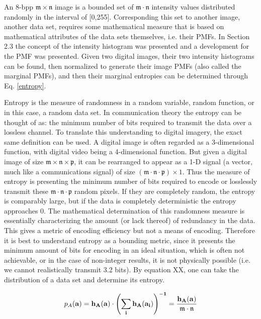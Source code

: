 An 8-bpp $\mathfrak{m} \times \mathfrak{n}$ image is a bounded  set of $\mathfrak{m} \cdot \mathfrak{n}$ intensity values distributed randomly in the interval of [0,255]. Corresponding this set to another image, \ie another data set, requires some mathematical measure that is based on mathematical attributes of the data sets themselves, i.e. their PMFs. In Section 2.3 the concept of the intensity histogram was presented and a development for the PMF was presented. Given two digital images, their two intensity histograms can be found, then normalized to generate their image PMFs (also called the marginal PMFs), and then their marginal entropies can be determined through Eq. \ref{entropy}.

Entropy is the measure of randomness in a random variable, random function, or in this case, a random data set. In communication theory the entropy can be thought of as: the minimum number of bits required to transmit the data over a lossless channel. To translate this understanding to digital imagery, the exact same definition can be used. A digital image is often regarded as a 3-dimensional function, with digital video being a 4-dimensional function. But given a digital image of size $\mathfrak{m} \times \mathfrak{n} \times \mathfrak{p}$, it can be rearranged to appear as a 1-D signal (a vector, much like a communications signal) of size $(\mathfrak{m} \cdot \mathfrak{n} \cdot \mathfrak{p}) \times 1$. Thus the measure of entropy is presenting the minimum number of bits required to encode or losslessly transmit these $\mathfrak{m} \cdot \mathfrak{n} \cdot \mathfrak{p}$ random pixels. If they are completely random, the entropy is comparably large, but if the data is completely deterministic the entropy approaches 0. The mathematical determination of this randomness measure is essentially characterizing the amount (or lack thereof) of redundancy in the data. This gives a metric of encoding efficiency but not a means of encoding. Therefore it is best to understand entropy as a bounding metric, since it presents the minimum amount of bits for encoding in an ideal situation, which is often not achievable, or in the case of non-integer results, it is not physically possible (i.e. we cannot realistically transmit 3.2 bits). By equation XX, one can take the distribution of a data set and determine its entropy.

\begin{equation}
\label{PMF}
	p_{A}(\bf{a})=h_{A}(\bf{a}) \cdot \left(\sum_{i}{h_{A}(a_{i})} \right)^{-1} = \frac{h_{A}(\bf{a})}{\mathfrak{m}\cdot\mathfrak{n}}
\end{equation}

